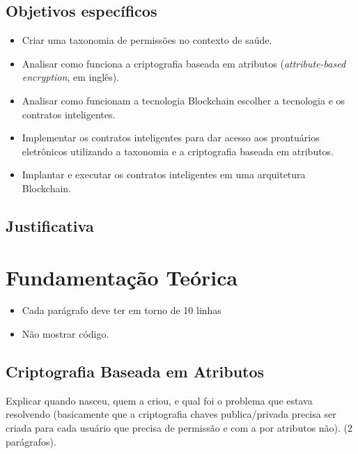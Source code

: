 \documentclass[a4paper,11pt]{article}
\begin{document}
\subsection{Objetivos específicos}

\begin{itemize}

\item Criar uma taxonomia de permissões no contexto de saúde.

\item Analisar como funciona a criptografia baseada em atributos (\textit{attribute-based encryption}, em inglês).

\item Analisar como funcionam a tecnologia Blockchain {\color{red}escolher a tecnologia} e os contratos inteligentes.

\item Implementar os contratos inteligentes para dar acesso aos prontuários eletrônicos utilizando a taxonomia e a criptografia baseada em atributos.

\item Implantar e executar os contratos inteligentes em uma arquitetura Blockchain.

\end{itemize}

\subsection{Justificativa}

\newpage
\section{Fundamentação Teórica}

\begin{itemize}
    \item {\color{red}Cada parágrafo deve ter em torno de 10 linhas}
    \item {\color{red}Não mostrar código.}
\end{itemize}

\subsection{Criptografia Baseada em Atributos} \label{sec:sub:abe}

{\color{ForestGreen}Explicar quando nasceu, quem a criou, e qual foi o problema que estava resolvendo (basicamente que a criptografia chaves publica/privada precisa ser criada para cada usuário que precisa de permissão e com a por atributos não). (2 parágrafos).} %
\end{document}
